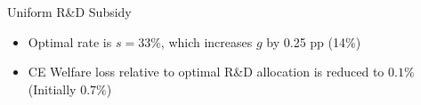 \documentclass[english,aspectratio=169,handout]{beamer}
\theoremstyle{plain}
\begin{document}
\begin{frame}{Uniform R\&D Subsidy \hyperlink{optimal}{}}
  \begin{center}
    \vspace{-10mm}
    \begin{figure}
      \centering{}\setcounter{subfigure}{0}
    \end{figure}
    \par\end{center}
  \begin{itemize}
    \item Optimal rate is $s=33\%$, which increases $g$ by 0.25 pp (14\%)
    \item CE Welfare loss relative to optimal R\&D allocation is reduced to
          $0.1\%$ (Initially $0.7\%$)
  \end{itemize}
\end{frame}
%
\end{document}
